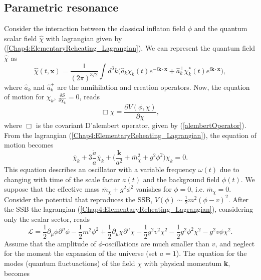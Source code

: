 \documentclass[11pt,a4paper,twoside]{book}
\begin{document}
\subsection{Parametric resonance}
Consider the interaction between the classical inflaton field $\phi$ and the quantum scalar field $\hat{\chi}$ with lagrangian given by (\ref{Chap4:ElementaryReheating_Lagrangian}). We can represent the quantum field $\hat{\chi}$ as 
\begin{equation}
	\label{Chap4:RepresentationScalarField}
	\hat{\chi}(t,\textbf{x}) = \frac{1}{(2\pi)^{3/2}}\int d^{3}k \Bigg(\hat{a}_{k} \chi_{k}(t)e^{-i\textbf{k}\cdot\textbf{x}} + \hat{a}^{+}_{k} \chi_{k}^{*}(t)e^{i\textbf{k}\cdot\textbf{x}}\Bigg),
\end{equation}
where $ \hat{a}_{k} $ and $ \hat{a}^{+}_{k} $ are the annihilation and creation operators. Now, the equation of motion for $\chi_{k}$, $ \frac{\delta S}{\delta \chi_{k}}=0 $, reads
\begin{equation}
	\label{Chap4:elemReheating_eomChi1}
	\Box \chi = \frac{\partial V(\phi,\chi)}{\partial \chi},
\end{equation}
where $\Box$ is the covariant D'alembert operator, given by (\ref{alembertOperator}). From the lagrangian (\ref{Chap4:ElementaryReheating_Lagrangian}), the equation of motion becomes
\begin{equation}
	\label{Chap4:elemReheating_eomChi}
	\ddot{\chi_{k}} + 3\frac{\dot{a}}{a}\dot{\chi_{k}} + \Bigg(\frac{\textbf{k}}{a^{2}} + \bar{m}^{2}_{\chi} + g^{2}\phi^{2}\Bigg)\chi_{k}=0.
\end{equation}
This equation describes an oscillator with a variable frequency $\omega(t)$ due to changing with time of the scale factor $ a(t) $ and the background field $ \phi(t) $. We suppose that the effective mass $ \bar{m}_{\chi} + g^{2}\phi^{2} $ vanishes for $ \phi=0 $, i.e. $  \bar{m}_{\chi}=0 $.\\
Consider the potential that reproduces the SSB, $ V(\phi) \sim \frac{1}{2} m^{2} (\phi - v)^{2} $.  After the SSB the lagrangian (\ref{Chap4:ElementaryReheating_Lagrangian}), considering only the scalar sector, reads
\begin{equation}
\label{Chap4:ParamResonanceLagrangian}
\mathcal{L}=\frac{1}{2}\partial_{\mu}\phi\partial^{\mu}\phi -\frac{1}{2}m^{2}\phi^{2}+ \frac{1}{2}\partial_{\mu} \chi \partial^{\mu}\chi-\frac{1}{2}g^{2}v^{2}\chi^{2} - \frac{1}{2}g^{2}\phi^{2}\chi^{2}-g^{2}v\phi\chi^{2}.
\end{equation}  
Assume that the amplitude of $\phi$-oscillations are much smaller than $ v $, and neglect for the moment the expansion of the universe (set $ a=1 $). The equation for the modes (quantum fluctuactions) of the field $\chi$ with physical momentum \textbf{k}, becomes
\end{document}
